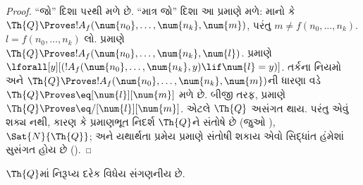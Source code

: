 \begin{proof}
  ``જો'' દિશા
  પરથી મળે છે. ``માત્ર જો'' દિશા
  આ પ્રમાણે મળે: માનો કે
  $\Th{Q} \Proves !A_f(\num{n_0},
  \dots, \num{n_k}, \num{m})$,
  પરંતુ $m \neq f(n_0, \dots, n_k)$.
  $l = f(n_0, \dots, n_k)$ લો.
  પ્રમાણે $\Th{Q}
  \Proves !A_f(\num{n_0}, \dots,
  \num{n_k}, \num{l})$.
  પ્રમાણે
  $\lforall[y][(!A_f(\num{n_0}, \dots,
  \num{n_k}, y) \lif \num{l} =
  y)]$. તર્કના નિયમો અને
  $\Th{Q} \Proves
  !A_f(\num{n_0}, \dots,
  \num{n_k}, \num{m})$ની ધારણા વડે
  $\Th{Q} \Proves
  \eq[\num{l}][\num{m}]$ મળે છે.
  બીજી તરફ,
   પ્રમાણે
  $\Th{Q} \Proves
  \eq/[\num{l}][\num{m}]$.
  એટલે $\Th{Q}$ અસંગત થાય.
  પરંતુ એવું શક્ય નથી, કારણ કે
  પ્રમાણભૂત નિદર્શ $\Th{Q}$ને સંતોષે
  છે (જુઓ
  ),
  $\Sat{N}{\Th{Q}}$; અને યથાર્થતા
  પ્રમેય પ્રમાણે સંતોષી શકાય એવો
  સિદ્ધાંત હંમેશાં સુસંગત હોય છે
  ().
\end{proof}

\begin{lem}
$\Th{Q}$માં નિરૂપ્ય દરેક વિધેય
સંગણનીય છે.
\end{lem}

